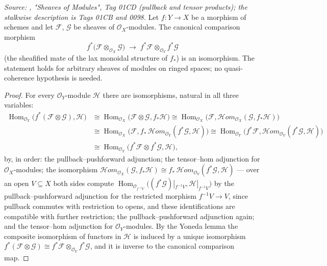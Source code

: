 \begin{lemma}\leanok
  \label{lem:pullback_tensor_map_isiso}
  \textit{Source: \cite{stacks-project}, "Sheaves of Modules", Tag 01CD (pullback
  and tensor products); the stalkwise description is Tags 01CB and 0098.}
  Let \(f : Y \to X\) be a morphism of schemes and let \(\mathcal{F}\),
  \(\mathcal{G}\) be sheaves of \(\mathcal{O}_X\)-modules.  The canonical
  comparison morphism
  \[
    f^*\bigl(\mathcal{F} \otimes_{\mathcal{O}_X} \mathcal{G}\bigr)
    \;\longrightarrow\;
    f^*\mathcal{F} \otimes_{\mathcal{O}_Y} f^*\mathcal{G}
  \]
  (the sheafified mate of the lax monoidal structure of \(f_*\)) is an
  isomorphism.  The statement holds for arbitrary sheaves of modules on
  ringed spaces; no quasi-coherence hypothesis is needed.
\end{lemma}
\begin{proof}
  For every \(\mathcal{O}_Y\)-module \(\mathcal{H}\) there are isomorphisms,
  natural in all three variables:
  \begin{align*}
    \operatorname{Hom}_{\mathcal{O}_Y}\!\bigl(f^*(\mathcal{F} \otimes
      \mathcal{G}), \mathcal{H}\bigr)
    &\cong \operatorname{Hom}_{\mathcal{O}_X}\!\bigl(\mathcal{F} \otimes
      \mathcal{G}, f_*\mathcal{H}\bigr)
    \cong \operatorname{Hom}_{\mathcal{O}_X}\!\bigl(\mathcal{F},
      \mathcal{H}om_{\mathcal{O}_X}(\mathcal{G}, f_*\mathcal{H})\bigr) \\
    &\cong \operatorname{Hom}_{\mathcal{O}_X}\!\bigl(\mathcal{F},
      f_*\,\mathcal{H}om_{\mathcal{O}_Y}(f^*\mathcal{G}, \mathcal{H})\bigr)
    \cong \operatorname{Hom}_{\mathcal{O}_Y}\!\bigl(f^*\mathcal{F},
      \mathcal{H}om_{\mathcal{O}_Y}(f^*\mathcal{G}, \mathcal{H})\bigr) \\
    &\cong \operatorname{Hom}_{\mathcal{O}_Y}\!\bigl(f^*\mathcal{F} \otimes
      f^*\mathcal{G}, \mathcal{H}\bigr),
  \end{align*}
  by, in order: the pullback--pushforward adjunction; the tensor--hom
  adjunction for \(\mathcal{O}_X\)-modules; the isomorphism
  \(\mathcal{H}om_{\mathcal{O}_X}(\mathcal{G}, f_*\mathcal{H}) \cong
  f_*\,\mathcal{H}om_{\mathcal{O}_Y}(f^*\mathcal{G}, \mathcal{H})\) — over
  an open \(V \subseteq X\) both sides compute
  \(\operatorname{Hom}_{\mathcal{O}_{f^{-1}V}}\bigl((f^*\mathcal{G})|_{f^{-1}V},
  \mathcal{H}|_{f^{-1}V}\bigr)\) by the pullback--pushforward adjunction for
  the restricted morphism \(f^{-1}V \to V\), since pullback commutes with
  restriction to opens, and these identifications are compatible with
  further restriction; the pullback--pushforward adjunction again; and the
  tensor--hom adjunction for \(\mathcal{O}_Y\)-modules.  By the Yoneda lemma
  the composite isomorphism of functors in \(\mathcal{H}\) is induced by a
  unique isomorphism \(f^*(\mathcal{F} \otimes \mathcal{G}) \cong
  f^*\mathcal{F} \otimes_{\mathcal{O}_Y} f^*\mathcal{G}\), and it is inverse
  to the canonical comparison map.
\end{proof}

